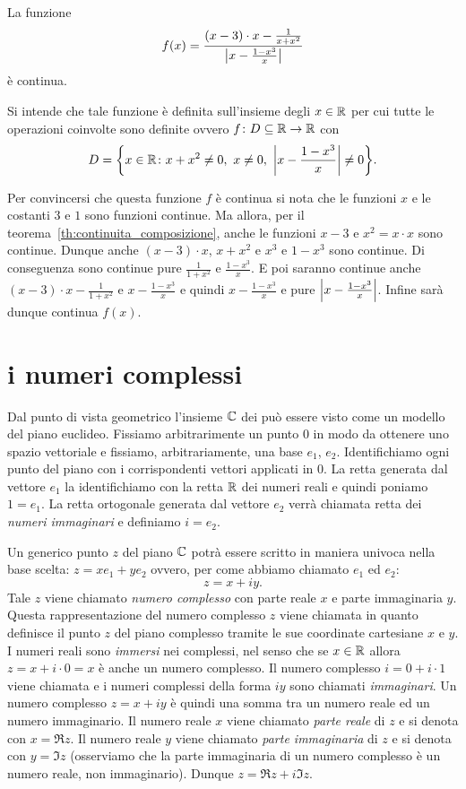\begin{example}
La funzione
\[
f(x) = \frac{(x-3)\cdot x -\frac{1}{x+x^2}}{{\left|x-\frac{1-x^3}{x}\right|}}
\]
è continua.

Si intende che tale funzione è definita sull'insieme degli $x\in \mathbb R$
per cui tutte le operazioni coinvolte sono definite ovvero
$f\colon D \subseteq \mathbb R \to \mathbb R$
con
\[
  D = \ENCLOSE{x\in \RR \colon x+x^2 \neq 0,\ x\neq 0,\ \abs{x-\frac{1-x^3}{x}}\neq 0}.
\]

Per convincersi che questa funzione $f$ è continua
si nota che le funzioni $x$ e le costanti $3$ e $1$ sono
funzioni continue.
Ma allora, per il teorema~\ref{th:continuita_composizione},
anche le funzioni $x-3$ e $x^2=x\cdot x$ sono continue.
Dunque anche $(x-3)\cdot x$, $x+x^2$ e $x^3$ e $1-x^3$ sono continue.
Di conseguenza sono continue pure $\frac 1{1+x^2}$ e $\frac{1-x^3}{x}$.
E poi saranno continue anche $(x-3)\cdot x - \frac 1{1+x^2}$ e $x-\frac{1-x^3}{x}$
e quindi $x-\frac{1-x^3}{x}$ e pure ${\left|x-\frac{1-x^3}{x}\right|}$. Infine sarà
dunque continua $f(x)$.
\end{example}

\section{i numeri complessi}

Dal punto di vista geometrico l'insieme $\CC$ dei 
\index{$\CC$}
può essere visto come un modello del piano euclideo.
Fissiamo arbitrarimente un punto $0$ in modo da ottenere uno spazio
vettoriale e fissiamo, arbitrariamente, una base $e_1$, $e_2$.
Identifichiamo ogni punto del piano con i corrispondenti vettori
applicati in $0$. La retta generata dal vettore $e_1$ la identifichiamo
con la retta $\mathbb R$ dei numeri reali e quindi poniamo $1=e_1$.
La retta ortogonale generata dal vettore $e_2$ verrà chiamata
retta dei \emph{numeri immaginari} e definiamo $i=e_2$.

Un generico punto $z$ del piano $\CC$ potrà essere scritto in
maniera univoca nella base scelta: $z = x e_1 + y e_2$ ovvero,
per come abbiamo chiamato $e_1$ ed $e_2$:
\[
z = x + i y.
\]
Tale $z$ viene chiamato
\emph{numero complesso} con parte reale $x$ e parte immaginaria $y$.
Questa rappresentazione del numero complesso $z$ viene
chiamata  in quanto definisce
il punto $z$ del piano complesso tramite le sue coordinate cartesiane
$x$ e $y$.
I numeri reali sono \emph{immersi} nei complessi, nel senso che se
$x\in \mathbb R$ allora $z= x + i\cdot 0 = x$ è anche un numero complesso.
Il numero complesso $i = 0 + i\cdot 1$ viene chiamata 
e i numeri complessi della forma $iy$ sono chiamati \emph{immaginari}.
Un numero
complesso $z = x+iy$ è quindi una somma tra un numero reale ed un numero
immaginario. Il numero reale $x$ viene chiamato \emph{parte reale}
di $z$ e
si denota con $x=\Re z$.
Il numero reale $y$ viene chiamato
\emph{parte immaginaria}
di $z$ e si denota con $y=\Im z$
(osserviamo che la parte immaginaria di un numero complesso è un numero
reale, non immaginario). Dunque $z= \Re z + i \Im z$.

